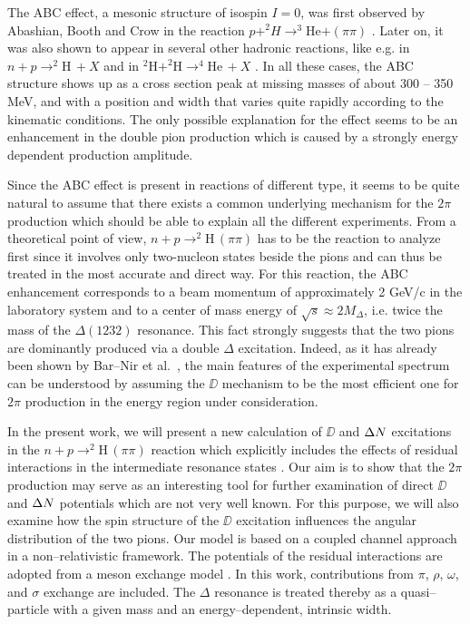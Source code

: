The ABC effect, a mesonic structure of isospin $I=0$, was first observed by
Abashian, Booth and Crow in the reaction $p+^2H \to ^3$He$ + (\pi\pi)$
\cite{abashian61,abashian63,banaigs73}. 
Later on, it was also shown to appear in several other hadronic reactions,
like e.g. in $n+p \to ^2$H$\, + X$ \cite{plouin78,abdivaliev80}
and in $^2$H$+ ^2$H$\to ^4$He$\, + X$ \cite{banaigs76,willis97}.
In all these cases, the ABC structure shows up as a cross section peak
at missing masses of about 300 -- 350 MeV, and with a position and width
that varies quite rapidly according to the kinematic conditions.
The only possible explanation for the effect seems to be an enhancement 
in the double pion production which is caused by a strongly energy 
dependent production amplitude.

Since the ABC effect is present in 
reactions of different type, it seems to be quite natural to assume 
that there exists a common underlying mechanism for the $2\pi$ production
which should be able to explain all the different experiments.
From a theoretical point of view, $n+p \to ^2$H$\, (\pi \pi)$ has 
to be the reaction to analyze first since it involves only two-nucleon 
states beside the pions and can thus be treated in the most accurate and direct way.  
For this reaction, the ABC enhancement corresponds to a beam momentum of 
approximately 2 GeV/c in the laboratory system and to a center of mass
energy of $\sqrt{s} \approx 2 M_\Delta$, i.e. twice the mass of the
$\Delta (1232)$ resonance. This fact strongly suggests 
that the two pions are dominantly produced via a double $\Delta$ 
excitation. Indeed, as it has already been shown by Bar--Nir et al.\ 
\cite{barnir75,risser73}, the main features of the experimental spectrum
can be understood by assuming the $\DD$ mechanism to be the most 
efficient one for $2 \pi$ production in the energy region under consideration. 

In the present work, we will present a new calculation of $\DD$ and ${\Delta N}$
excitations
in the $n+p \to ^2$H$\, (\pi \pi)$ reaction which explicitly includes the 
effects of residual interactions in the intermediate resonance states
\cite{mosbacher98b,mosbacher98c}. 
Our aim is to show that the $2\pi$ production may serve as 
an interesting tool for further examination of direct $\DD$ and ${\Delta N}$ potentials 
which are not very well known. For this purpose, we will also examine how the
spin structure of the $\DD$ excitation influences the angular distribution
of the two pions. Our model is based on a coupled channel approach
in a non--relativistic framework. The potentials of the residual interactions 
are adopted from a meson exchange model \cite{mosbacher97,machleidt87}.
In this work, contributions from $\pi$, $\rho$, $\omega$, and $\sigma$
exchange are included. 
The $\Delta$ resonance is treated thereby as a quasi--particle with a given
mass and an energy--dependent, intrinsic width.

